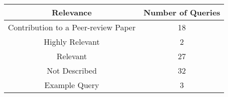 \begin{center}
    \begin{tabular}{|c|c|}
        Relevance & Number of Queries \\
        \hline
        Contribution to a Peer-review Paper & 18 \\
        \hline
        Highly Relevant                     & 2 \\
        \hline
        Relevant                            & 27 \\
        \hline
        Not Described                       & 32 \\
        \hline
        Example Query                       & 3 \\
    \end{tabular}
\end{center}
    